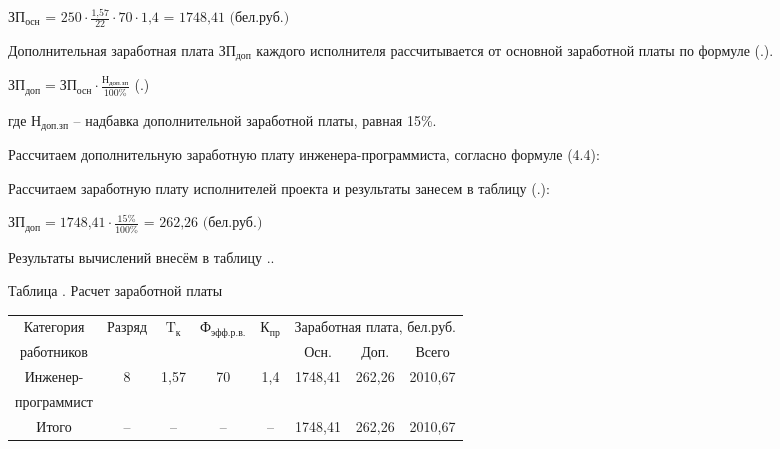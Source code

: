 {	\formulaspace \par \redline 
		$\textrm{ЗП}_{\textrm{осн}} \textrm{ = 250} \cdot \frac{\textrm{1,57}}{\textrm{22}} \cdot \textrm{70} \cdot \textrm{1,4 = 1748,41 (бел.руб.)}$ 
	\formulaspace 
	
	\par \redline Дополнительная заработная плата $\textrm{ЗП}_{\textrm{доп}}$ каждого исполнителя рассчитывается от основной заработной платы по формуле (\thechaptercntr .\theformulacntr).
	
	\formulaspace \par \redline 
		$\textrm{ЗП}_{\textrm{доп}} = \textrm{ЗП}_{\textrm{осн}} \cdot \frac{\textrm{Н}_{\textrm{доп.зп}}}{\textrm{100\%}}$
	\hfill (\thechaptercntr .\theformulacntr) \redline
	\formulaspace
	
	\par \redline где $\textrm{Н}_{\textrm{доп.зп}}$ {--} надбавка дополнительной заработной платы, равная 15\%.

	\par \redline Рассчитаем дополнительную заработную плату инженера-программиста, согласно формуле (4.4):

	\par \redline Рассчитаем заработную плату исполнителей проекта и результаты занесем в таблицу (\thechaptercntr .\theformulacntr): \addtocounter{formulacntr}{1}
	
	\formulaspace \par \redline 
		$\textrm{ЗП}_{\textrm{доп}} = \textrm{1748,41} \cdot \frac{\textrm{15\%}}{\textrm{100\%}} \textrm{ = 262,26 (бел.руб.)}$
	\formulaspace

	\par \redline Результаты вычислений внесём в таблицу \thechaptercntr .\thetablecntr.

	\formulaspace
	{\begin{Center} 
		\par Таблица \thechaptercntr .\thetablecntr \spc {--} Расчет заработной платы
		
		\begin{tabular}{|c|c|c|c|c|c|c|c|}
		\hline
		Категория  & \multirow{2}{*}{Разряд } & \multirow{2}{*}{$\textrm{T}_{\textrm{к}}$} & \multirow{2}{*}{$\textrm{Ф}_{\textrm{эфф.р.в.}}$} & \multirow{2}{*}{$\textrm{К}_{\textrm{пр}}$} & \multicolumn{3}{c|}{Заработная плата, бел.руб.} \\ \cline{6-8}
  		работников & & & & & Осн. & Доп. & Всего \\ \hline
		Инженер-   & \multirow{2}{*}{8} & \multirow{2}{*}{1,57} & \multirow{2}{*}{70} & \multirow{2}{*}{1,4} & \multirow{2}{*}{1748,41} & \multirow{2}{*}{262,26} & \multirow{2}{*}{2010,67} \\
		программист& & & & & & & \\ \hline
		Итого   & {--} & {--} & {--} & {--} & 1748,41 & 262,26 & 2010,67 \\ \hline
	\end{tabular} \end{Center}}
	\formulaspace

}
